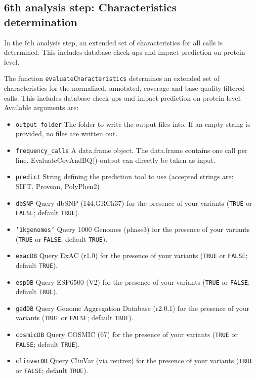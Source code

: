 \documentclass{article}
\begin{document}
\subsection{6th analysis step: Characteristics determination}

In the 6th analysis step, an extended set of characteristics for all calls is determined. This includes database check-ups and impact prediction on protein level.

The function \texttt{evaluateCharacteristics} determines an extended set of characteristics for the normalized, annotated, coverage and base quality filtered calls. This includes database check-ups and impact prediction on protein level. Available arguments are:

\begin{itemize}
  \item \texttt{output\_folder} The folder to write the output files into. If an empty string is provided, no files are written out.
  \item \texttt{frequency\_calls} A data.frame object. The data.frame contains one call per line. EvaluateCovAndBQ()-output can directly be taken as input.
  \item \texttt{predict} String defining the prediction tool to use (accepted strings are: SIFT, Provean, PolyPhen2)
  \item \texttt{dbSNP} Query dbSNP (144.GRCh37) for the presence of your variants (\texttt{TRUE} or \texttt{FALSE}; default \texttt{TRUE}).
  \item \texttt{'1kgenomes'} Query 1000 Genomes (phase3) for the presence of your variants (\texttt{TRUE} or \texttt{FALSE}; default \texttt{TRUE}).
  \item \texttt{exacDB} Query ExAC (r1.0) for the presence of your variants (\texttt{TRUE} or \texttt{FALSE}; default \texttt{TRUE}).
  \item \texttt{espDB} Query ESP6500 (V2) for the presence of your variants (\texttt{TRUE} or \texttt{FALSE}; default \texttt{TRUE}).
  \item \texttt{gadDB} Query Genome Aggregation Database (r2.0.1) for the presence of your variants (\texttt{TRUE} or \texttt{FALSE}; default \texttt{TRUE}).
  \item \texttt{cosmicDB} Query COSMIC (67) for the presence of your variants (\texttt{TRUE} or \texttt{FALSE}; default \texttt{TRUE}).
  \item \texttt{clinvarDB} Query ClinVar (via rentrez) for the presence of your variants (\texttt{TRUE} or \texttt{FALSE}; default \texttt{TRUE}).
\end{itemize}
\end{document}
